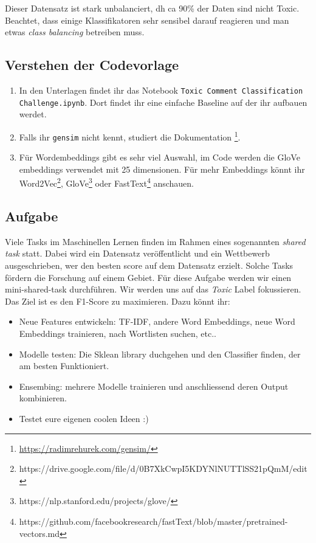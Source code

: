 \documentclass[a4paper,10pt]{article}
\newcommand{\punkte}[1]{(\emph{#1 p})}
\begin{document}
Dieser Datensatz ist stark unbalanciert, dh ca 90\% der Daten sind nicht Toxic. Beachtet, dass einige Klassifikatoren sehr sensibel darauf reagieren und man etwas \emph{class balancing} betreiben muss.

\subsection{Verstehen der Codevorlage}
\begin{enumerate}
\item In den Unterlagen findet ihr das Notebook \texttt{Toxic Comment Classification Challenge.ipynb}. Dort findet ihr eine einfache Baseline auf der ihr aufbauen werdet.
\item Falls ihr \lstinline!gensim! nicht kennt, studiert die Dokumentation \footnote{\url{https://radimrehurek.com/gensim/}}. 
\item Für Wordembeddings gibt es sehr viel Auswahl, im Code werden die GloVe embeddings verwendet mit 25 dimensionen. Für mehr Embeddings könnt ihr Word2Vec\footnote{https://drive.google.com/file/d/0B7XkCwpI5KDYNlNUTTlSS21pQmM/edit}, GloVe\footnote{https://nlp.stanford.edu/projects/glove/} oder FastText\footnote{https://github.com/facebookresearch/fastText/blob/master/pretrained-vectors.md} anschauen.
\end{enumerate}

\subsection{Aufgabe}
Viele Tasks im Maschinellen Lernen finden im Rahmen eines sogenannten \emph{shared task} statt. Dabei wird ein Datensatz veröffentlicht und ein Wettbewerb ausgeschrieben, wer den besten score auf dem Datensatz erzielt. Solche Tasks fördern die Forschung auf einem Gebiet. 
Für diese Aufgabe werden wir einen mini-shared-task durchführen. Wir werden uns auf das \emph{Toxic} Label fokussieren. Das Ziel ist es den F1-Score zu maximieren. Dazu könnt ihr:
\begin{itemize}
\item Neue Features entwickeln: TF-IDF, andere Word Embeddings, neue Word Embeddings trainieren, nach Wortlisten suchen, etc..
\item Modelle testen: Die Sklean library duchgehen und den Classifier finden, der am besten Funktioniert.
\item Ensembing: mehrere Modelle trainieren und anschliessend deren Output kombinieren.
\item Testet eure eigenen coolen Ideen :)
\end{itemize}
\end{document}
